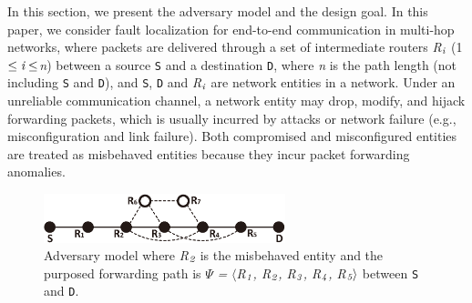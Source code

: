 In this section, we present the adversary model and the design goal. In this paper, we consider fault localization for end-to-end communication in multi-hop networks, where packets are delivered through a set of intermediate routers \emph{R}$_\emph{i}$ (1$\leq \emph{i} \leq$\emph{n}) between a source {\tt S} and a destination {\tt D},  where \emph{n} is the path length (not including {\tt S} and {\tt D}), and {\tt S}, {\tt D} and \emph{R}$_\emph{i}$ are network entities in a network.  
Under an unreliable communication channel, a network entity may drop, modify, and hijack  forwarding packets, which is usually incurred by attacks or network failure (e.g., misconfiguration and link failure). Both compromised and misconfigured entities are treated as misbehaved entities because they incur packet forwarding anomalies. 
\begin{figure}%
\begin{center}
\includegraphics[width=7cm]{visio/attackmodel3.eps}
\caption{Adversary model where \emph{R}$_\emph{2}$ is the misbehaved entity and the purposed forwarding path is $\Psi$ \emph{=} $\langle$\emph{R}$_\emph{1}$\emph{, R}$_\emph{2}$\emph{, R}$_\emph{3}$\emph{, R}$_\emph{4}$\emph{, R}$_\emph{5}\rangle$ between {\tt S} and {\tt D}.}\label{attackmodel}
\end{center}
\vspace{-3mm}
\end{figure}
\vspace{-0.1in}

